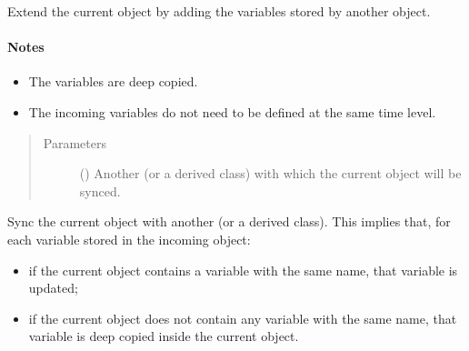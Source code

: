 \documentclass[letterpaper,10pt,english]{sphinxmanual}
\begin{document}
\begin{fulllineitems}
\begin{fulllineitems}
\end{fulllineitems}


\begin{fulllineitems}
\label{\detokenize{api:storages.grid_data.GridData.extend}}
Extend the current object by adding the variables stored by another object.
\paragraph{Notes}
\begin{itemize}
\item {} 
The variables are deep copied.

\item {} 
The incoming variables do not need to be defined at the same time level.

\end{itemize}
\begin{quote}\begin{description}
\item[{Parameters}] \leavevmode
{} () \textendash{} Another {\hyperref[\detokenize{api:storages.grid_data.GridData}]{}} (or a derived class) with which the current object will be synced.

\end{description}\end{quote}

\end{fulllineitems}


\begin{fulllineitems}
\label{\detokenize{api:storages.grid_data.GridData.extend_and_update}}
Sync the current object with another {\hyperref[\detokenize{api:storages.grid_data.GridData}]{}} (or a derived class).
This implies that, for each variable stored in the incoming object:
\begin{itemize}
\item {} 
if the current object contains a variable with the same name, that variable is updated;

\item {} 
if the current object does not contain any variable with the same name, that variable is deep copied inside                   the current object.


\end{itemize}
\end{fulllineitems}
\end{fulllineitems}
\end{document}
